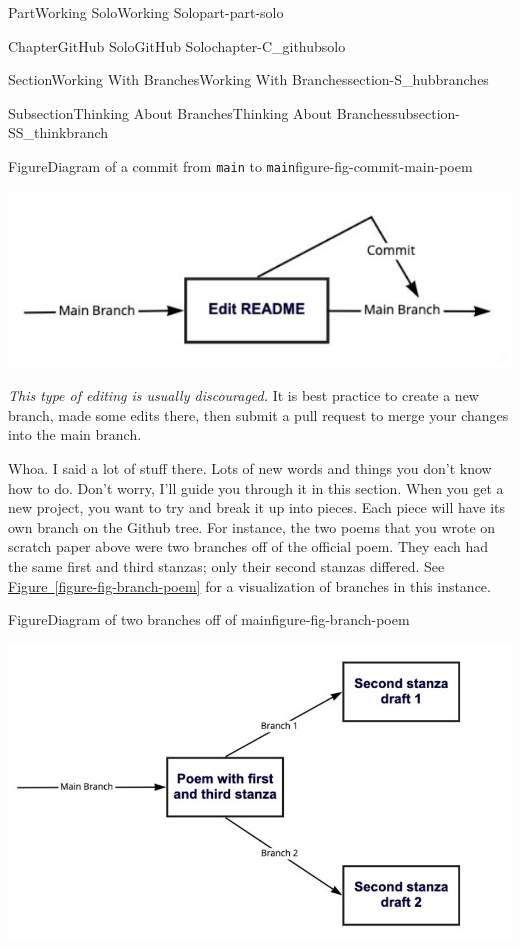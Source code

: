 \documentclass[oneside,10pt,]{book}
\newcommand{\xreffont}{\relax}
\newcommand{\mono}[1]{\texttt{#1}}
\begin{document}
\begin{partptx}{Part}{Working Solo}{}{Working Solo}{}{}{part-part-solo}
\begin{chapterptx}{Chapter}{GitHub Solo}{}{GitHub Solo}{}{}{chapter-C_githubsolo}
\begin{sectionptx}{Section}{Working With Branches}{}{Working With Branches}{}{}{section-S_hubbranches}
\begin{subsectionptx}{Subsection}{Thinking About Branches}{}{Thinking About Branches}{}{}{subsection-SS_thinkbranch}
\begin{figureptx}{Figure}{Diagram of a commit from \mono{main} to \mono{main}}{figure-fig-commit-main-poem}{}%
\begin{image}{0.05}{0.9}{0.05}{}%
\includegraphics[width=\linewidth]{external/commit_main_poem.pdf}
\end{image}%
\tcblower
\end{figureptx}%
\emph{This type of editing is usually discouraged.} It is best practice to create a new branch, made some edits there, then submit a pull request to merge your changes into the main branch.%
\par
Whoa. I said a lot of stuff there. Lots of new words and things you don't know how to do. Don't worry, I'll guide you through it in this section. When you get a new project, you want to try and break it up into pieces. Each piece will have its own branch on the Github tree. For instance, the two poems that you wrote on scratch paper above were two branches off of the official poem. They each had the same first and third stanzas; only their second stanzas differed. See \hyperref[figure-fig-branch-poem]{Figure~{\xreffont\ref{figure-fig-branch-poem}}} for a visualization of branches in this instance.%
\begin{figureptx}{Figure}{Diagram of two branches off of main}{figure-fig-branch-poem}{}%
\begin{image}{0}{1}{0}{}%
\includegraphics[width=\linewidth]{external/branch_poem.pdf}

\end{image}
\end{figureptx}
\end{subsectionptx}
\end{sectionptx}
\end{chapterptx}
\end{partptx}
\end{document}
